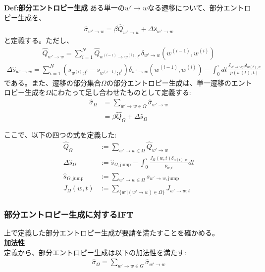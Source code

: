 \documentclass[a4paper,11pt]{jsarticle}
\numberwithin{equation}{section}
\begin{document}
\begin{itembox}[l]{\textbf{Def:部分エントロピー生成}}
    ある単一の$w' \to w$なる遷移について、部分エントロピー生成を、
    \begin{align}
        \hat{\sigma}_{w' \to w} = \beta \hat{Q}_{w' \to w} + \Delta \hat{s}_{w' \to w}
    \end{align}
    と定義する。ただし、
    \begin{align}
        \hat{Q}_{w' \to w} = \sum_{i = 1}^{N} \hat{Q}_{w^{(i-1)} \to w^{(i)};t^i}\delta_{w'\to w}(w^{(i-1)}, w^{(i)})
    \end{align}
    \begin{align}
        \Delta \hat{s}_{w' \to w} = \sum_{i=1}^{N} (s_{w^{(i)};t^i} - s_{w^{(i-1)};t^i})\delta_{w'\to w}(w^{(i-1)}, w^{(i)}) -\int_{0}^{\tau} dt \frac{J_{w' \to w; t}\delta_{w(t), w}}{p(w(t), t)}
    \end{align}
    である。また、遷移の部分集合$\Omega$の部分エントロピー生成は、単一遷移のエントロピー生成を$\Omega$にわたって足し合わせたものとして定義する:
    \begin{align}
        \hat{\sigma}_{\Omega} &= \sum_{w' \to w \in \Omega} \hat{\sigma}_{w' \to w}\\
        &= \beta\hat{Q}_{\Omega} + \Delta \hat{s}_{\Omega}
    \end{align}

\end{itembox}
ここで、以下の四つの式を定義した:
\begin{align}
    \hat{Q}_\Omega &:= \sum_{w' \to w \in \Omega} \hat{Q}_{w' \to w} \\
    \Delta \hat{s}_\Omega &:= \hat{s}_{\Omega, \text{jump}} - \int_0^\tau \frac{J_\Omega(w, t) \delta_{w(t), w}}{p_{w,t}} dt\\
    \hat{s}_{\Omega, \text{jump}} &:= \sum_{w' \to w \in \Omega} \hat{s}_{w' \to w, \text{jump}} \\
    J_\Omega(w, t) &:= \sum_{\{w' | (w' \to w) \in \Omega\}} J_{w' \to w; t}
\end{align}

\subsubsection{部分エントロピー生成に対するIFT}
上で定義した部分エントロピー生成が要請を満たすことを確かめる。\\
\textbf{加法性}\\
定義から、部分エントロピー生成は以下の加法性を満たす:%
\begin{align}
    \hat{\sigma}_{\Omega} = \sum_{w' \to w \in G} \hat{\sigma}_{w' \to w}
\end{align}
\end{document}
